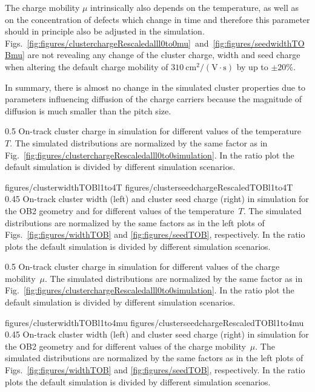 The charge mobility $\mu$ intrinsically also depends on the temperature, as well as on the concentration of defects which change in time and therefore this parameter should in principle also be adjusted in the simulation. Figs.~\ref{fig:figures/clusterchargeRescaledalll0to0mu}~and~\ref{fig:figures/seedwidthTOBmu} are not revealing any change of the cluster charge, width and seed charge when altering the default charge mobility of $310~\mathrm{cm^2/(V \cdot s)}$ by up to $\pm 20\%$. 

In summary, there is almost no change in the simulated cluster properties due to parameters influencing diffusion of the charge carriers because the magnitude of diffusion is much smaller than the pitch size.


                 {0.5}       %
                 { On-track cluster charge in simulation for different values of the temperature~$T$.   The simulated distributions are normalized by the same factor as in Fig.~\ref{fig:figures/clusterchargeRescaledalll0to0simulation}.  In the ratio plot the default simulation is divided by different simulation scenarios. }

                 {figures/clusterwidthTOBl1to4T}
                 {figures/clusterseedchargeRescaledTOBl1to4T} %
                 {0.45}       %
                 {  On-track cluster width (left) and cluster seed charge (right) in simulation  for the OB2 geometry and for different values of the temperature~$T$.  The simulated distributions are normalized by the same factors as in the left plots of Figs.~\ref{fig:figures/widthTOB} and \ref{fig:figures/seedTOB}, respectively.   In the ratio plots the default simulation is divided by different simulation scenarios. }

                 {0.5}       %
                 { On-track cluster charge in simulation for different values of the charge mobility~$\mu$.   The simulated distributions are normalized by the same factor as in Fig.~\ref{fig:figures/clusterchargeRescaledalll0to0simulation}.  In the ratio plot the default simulation is divided by different simulation scenarios. }

                 {figures/clusterwidthTOBl1to4mu}
                 {figures/clusterseedchargeRescaledTOBl1to4mu} %
                 {0.45}       %
                 { On-track cluster width (left) and cluster seed charge (right) in simulation  for the OB2 geometry and for different values of the charge mobility~$\mu$.  The simulated distributions are normalized by the same factors as in the left plots of Figs.~\ref{fig:figures/widthTOB} and \ref{fig:figures/seedTOB}, respectively.   In the ratio plots the default simulation is divided by different simulation scenarios. }

